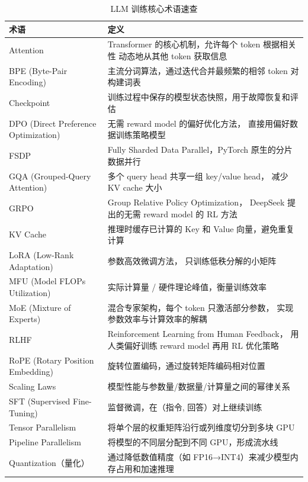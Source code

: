 \begin{table}[H]
\centering\small
\caption{LLM 训练核心术语速查}
\begin{tabularx}{\linewidth}{l X}
\toprule
\textbf{术语} & \textbf{定义} \\
\midrule
Attention &
  Transformer 的核心机制，允许每个 token 根据相关性
  动态地从其他 token 获取信息 \\
BPE (Byte-Pair Encoding) &
  主流分词算法，通过迭代合并最频繁的相邻 token 对构建词表 \\
Checkpoint &
  训练过程中保存的模型状态快照，用于故障恢复和评估 \\
DPO (Direct Preference Optimization) &
  无需 reward model 的偏好优化方法，
  直接用偏好数据训练策略模型~\cite{rafailov2023dpo} \\
FSDP &
  Fully Sharded Data Parallel，PyTorch 原生的分片数据并行 \\
GQA (Grouped-Query Attention) &
  多个 query head 共享一组 key/value head，
  减少 KV cache 大小 \\
GRPO &
  Group Relative Policy Optimization，
  DeepSeek 提出的无需 reward model 的 RL 方法~\cite{shao2024grpo} \\
KV Cache &
  推理时缓存已计算的 Key 和 Value 向量，避免重复计算 \\
LoRA (Low-Rank Adaptation) &
  参数高效微调方法，
  只训练低秩分解的小矩阵~\cite{hu2021lora} \\
MFU (Model FLOPs Utilization) &
  实际计算量 / 硬件理论峰值，衡量训练效率 \\
MoE (Mixture of Experts) &
  混合专家架构，每个 token 只激活部分参数，
  实现参数效率与计算效率的解耦 \\
RLHF &
  Reinforcement Learning from Human Feedback，
  用人类偏好训练 reward model 再用 RL 优化策略~\cite{ouyang2022rlhf} \\
RoPE (Rotary Position Embedding) &
  旋转位置编码，通过旋转矩阵编码相对位置~\cite{su2021rope} \\
Scaling Laws &
  模型性能与参数量/数据量/计算量之间的幂律关系~\cite{kaplan2020scaling} \\
SFT (Supervised Fine-Tuning) &
  监督微调，在（指令, 回答）对上继续训练 \\
Tensor Parallelism &
  将单个层的权重矩阵沿行或列维度切分到多块 GPU \\
Pipeline Parallelism &
  将模型的不同层分配到不同 GPU，形成流水线 \\
Quantization（量化） &
  通过降低数值精度（如 FP16→INT4）来减少模型内存占用和加速推理 \\

\end{tabularx}
\end{table}
